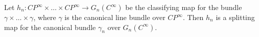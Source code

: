 Let $h_n: CP^\infty \times \dots \times CP^\infty \rightarrow G_n(C^\infty)$ be the classifying map for the bundle $\gamma \times \dots \times \gamma$, where $\gamma$ is the canonical line bundle over $CP^\infty$. Then $h_n$ is a splitting map for the canonical bundle $\gamma_n$ over $G_n(C^\infty)$.
